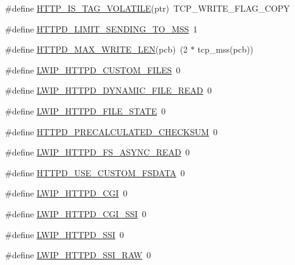 \begin{DoxyCompactItemize}
\item 
\#define \hyperlink{group__httpd__opts_ga662e88120b507426374dd8ebbd54a048}{H\+T\+T\+P\+\_\+\+I\+S\+\_\+\+T\+A\+G\+\_\+\+V\+O\+L\+A\+T\+I\+LE}(ptr)~T\+C\+P\+\_\+\+W\+R\+I\+T\+E\+\_\+\+F\+L\+A\+G\+\_\+\+C\+O\+PY
\item 
\#define \hyperlink{group__httpd__opts_ga5410b604b135deaf5efc472dd7ab9d88}{H\+T\+T\+P\+D\+\_\+\+L\+I\+M\+I\+T\+\_\+\+S\+E\+N\+D\+I\+N\+G\+\_\+\+T\+O\+\_\+M\+SS}~1
\item 
\#define \hyperlink{group__httpd__opts_ga9faa2c18e1963ab5dfae826f6ee6d874}{H\+T\+T\+P\+D\+\_\+\+M\+A\+X\+\_\+\+W\+R\+I\+T\+E\+\_\+\+L\+EN}(pcb)~(2 $\ast$ tcp\+\_\+mss(pcb))
\item 
\#define \hyperlink{group__httpd__opts_gadadb70f5663cdf004bf879e3b5d326bd}{L\+W\+I\+P\+\_\+\+H\+T\+T\+P\+D\+\_\+\+C\+U\+S\+T\+O\+M\+\_\+\+F\+I\+L\+ES}~0
\item 
\#define \hyperlink{group__httpd__opts_ga1ee8d7c975c7e3d1c9d9dd9b43660c79}{L\+W\+I\+P\+\_\+\+H\+T\+T\+P\+D\+\_\+\+D\+Y\+N\+A\+M\+I\+C\+\_\+\+F\+I\+L\+E\+\_\+\+R\+E\+AD}~0
\item 
\#define \hyperlink{group__httpd__opts_gaedd0fa3d356170d8ca3557acb410fd7c}{L\+W\+I\+P\+\_\+\+H\+T\+T\+P\+D\+\_\+\+F\+I\+L\+E\+\_\+\+S\+T\+A\+TE}~0
\item 
\#define \hyperlink{group__httpd__opts_ga6e5de8515c89af12277e4cb011165103}{H\+T\+T\+P\+D\+\_\+\+P\+R\+E\+C\+A\+L\+C\+U\+L\+A\+T\+E\+D\+\_\+\+C\+H\+E\+C\+K\+S\+UM}~0
\item 
\#define \hyperlink{group__httpd__opts_ga51cb673cb5cc362acc409f23c1e0a331}{L\+W\+I\+P\+\_\+\+H\+T\+T\+P\+D\+\_\+\+F\+S\+\_\+\+A\+S\+Y\+N\+C\+\_\+\+R\+E\+AD}~0
\item 
\#define \hyperlink{group__httpd__opts_gafd16fcfb798be426cc87611772ba437c}{H\+T\+T\+P\+D\+\_\+\+U\+S\+E\+\_\+\+C\+U\+S\+T\+O\+M\+\_\+\+F\+S\+D\+A\+TA}~0
\item 
\#define \hyperlink{group__httpd__opts_gafb28f7c5fee75f013a199d427452372c}{L\+W\+I\+P\+\_\+\+H\+T\+T\+P\+D\+\_\+\+C\+GI}~0
\item 
\#define \hyperlink{group__httpd__opts_gad3960bf65731bd0f1341867664afe860}{L\+W\+I\+P\+\_\+\+H\+T\+T\+P\+D\+\_\+\+C\+G\+I\+\_\+\+S\+SI}~0
\item 
\#define \hyperlink{group__httpd__opts_gacb70e0cdd30a940f8bce681c6cc63949}{L\+W\+I\+P\+\_\+\+H\+T\+T\+P\+D\+\_\+\+S\+SI}~0
\item 
\#define \hyperlink{group__httpd__opts_ga520858778b84d4d2fa125294c0f119e5}{L\+W\+I\+P\+\_\+\+H\+T\+T\+P\+D\+\_\+\+S\+S\+I\+\_\+\+R\+AW}~0

\end{DoxyCompactItemize}
